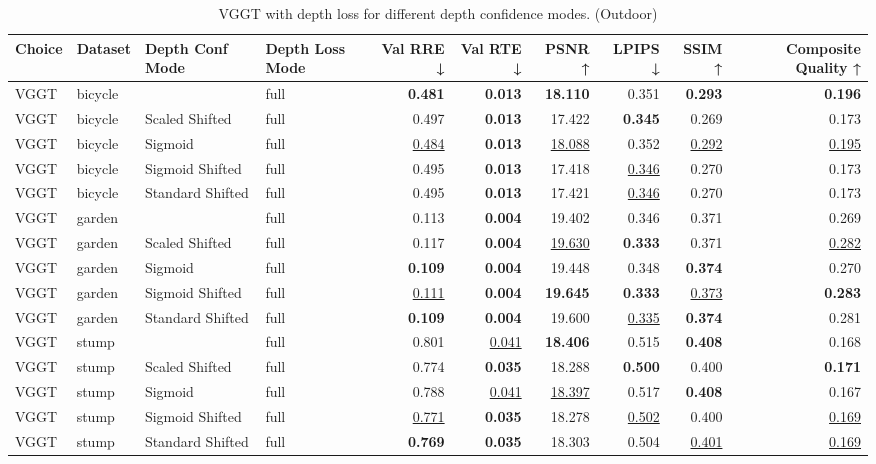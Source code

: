 \begin{table}[H]
\caption{\ifdefined\customcaption \customcaption \else VGGT with depth loss for different depth confidence modes. (Outdoor) \fi}
\label{tab:05_depth_conf_mode_brief_outdoor}
\centering
\scriptsize
\begin{tabular}{llllrrrrrr}
\toprule
Choice & Dataset & Depth Conf Mode & Depth Loss Mode & Val RRE ↓ & Val RTE ↓ & PSNR ↑ & LPIPS ↓ & SSIM ↑ & Composite Quality ↑ \\
\midrule
VGGT & bicycle &  & full & \textbf{0.481} & \textbf{0.013} & \textbf{18.110} & 0.351 & \textbf{0.293} & \textbf{0.196} \\
VGGT & bicycle & Scaled Shifted & full & 0.497 & \textbf{0.013} & 17.422 & \textbf{0.345} & 0.269 & 0.173 \\
VGGT & bicycle & Sigmoid & full & \underline{0.484} & \textbf{0.013} & \underline{18.088} & 0.352 & \underline{0.292} & \underline{0.195} \\
VGGT & bicycle & Sigmoid Shifted & full & 0.495 & \textbf{0.013} & 17.418 & \underline{0.346} & 0.270 & 0.173 \\
VGGT & bicycle & Standard Shifted & full & 0.495 & \textbf{0.013} & 17.421 & \underline{0.346} & 0.270 & 0.173 \\
\midrule
VGGT & garden &  & full & 0.113 & \textbf{0.004} & 19.402 & 0.346 & 0.371 & 0.269 \\
VGGT & garden & Scaled Shifted & full & 0.117 & \textbf{0.004} & \underline{19.630} & \textbf{0.333} & 0.371 & \underline{0.282} \\
VGGT & garden & Sigmoid & full & \textbf{0.109} & \textbf{0.004} & 19.448 & 0.348 & \textbf{0.374} & 0.270 \\
VGGT & garden & Sigmoid Shifted & full & \underline{0.111} & \textbf{0.004} & \textbf{19.645} & \textbf{0.333} & \underline{0.373} & \textbf{0.283} \\
VGGT & garden & Standard Shifted & full & \textbf{0.109} & \textbf{0.004} & 19.600 & \underline{0.335} & \textbf{0.374} & 0.281 \\
\midrule
VGGT & stump &  & full & 0.801 & \underline{0.041} & \textbf{18.406} & 0.515 & \textbf{0.408} & 0.168 \\
VGGT & stump & Scaled Shifted & full & 0.774 & \textbf{0.035} & 18.288 & \textbf{0.500} & 0.400 & \textbf{0.171} \\
VGGT & stump & Sigmoid & full & 0.788 & \underline{0.041} & \underline{18.397} & 0.517 & \textbf{0.408} & 0.167 \\
VGGT & stump & Sigmoid Shifted & full & \underline{0.771} & \textbf{0.035} & 18.278 & \underline{0.502} & 0.400 & \underline{0.169} \\
VGGT & stump & Standard Shifted & full & \textbf{0.769} & \textbf{0.035} & 18.303 & 0.504 & \underline{0.401} & \underline{0.169} \\
\bottomrule
\end{tabular}
\end{table}